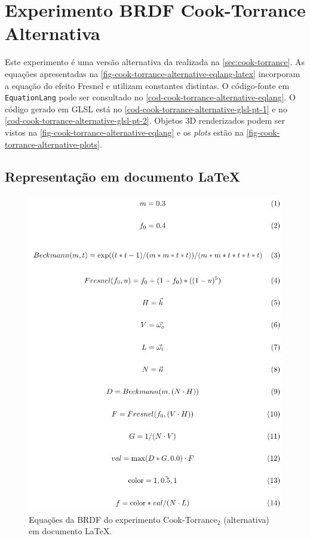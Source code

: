
\section{Experimento BRDF Cook-Torrance Alternativa}
\label{section-experiment-cook-torrance-alternative}

Este experimento é uma versão alternativa da realizada na \autoref{sec:cook-torrance}. As equações apresentadas na \autoref{fig-cook-torrance-alternative-eqlang-latex} incorporam a equação do efeito Fresnel e utilizam constantes distintas. O código-fonte em \texttt{EquationLang} pode ser consultado no \autoref{cod-cook-torrance-alternative-eqlang}. O código gerado em GLSL está no \autoref{cod-cook-torrance-alternative-glsl-pt-1} e no \autoref{cod-cook-torrance-alternative-glsl-pt-2}. Objetos 3D renderizados podem ser vistos na \autoref{fig-cook-torrance-alternative-eqlang} e os \textit{plots} estão na \autoref{fig-cook-torrance-alternative-plots}.


\subsection{Representação em documento \LaTeX{}}
\begin{figure}[H]
    \caption{\label{fig-cook-torrance-alternative-eqlang-latex}
    \small Equações da BRDF do experimento Cook-Torrance$_2$ (alternativa) em documento \LaTeX{}.}
    \begin{center}
        \includegraphics[scale=0.92]{./Imagens/brdfs/cook-torrance-alternative.pdf}
    \end{center}
\end{figure}

